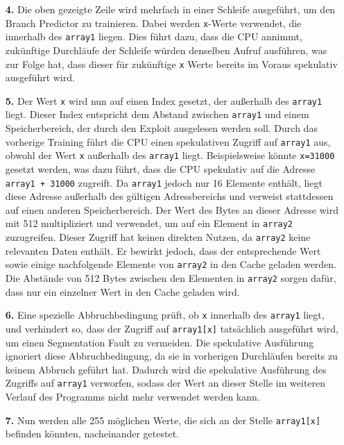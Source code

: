 \begin{itemize}
	\item[\textbf{4.}]\label{itm:spectre_step4} Die oben gezeigte Zeile wird mehrfach in einer Schleife ausgeführt, um den Branch Predictor zu trainieren.
	      Dabei werden \texttt{x}-Werte verwendet, die innerhalb des \texttt{array1} liegen.
	      Dies führt dazu, dass die CPU annimmt, zukünftige Durchläufe der Schleife würden denselben Aufruf ausführen,
	      was zur Folge hat, dass dieser für zukünftige \texttt{x} Werte bereits im Voraus spekulativ ausgeführt wird.
	\item[\textbf{5.}] Der Wert \texttt{x} wird nun auf einen Index gesetzt, der außerhalb des \texttt{array1} liegt.
	      Dieser Index entspricht dem Abstand zwischen \texttt{array1} und einem Speicherbereich, der durch den Exploit ausgelesen werden soll.
	      Durch das vorherige Training führt die CPU einen spekulativen Zugriff auf \texttt{array1} aus, obwohl der Wert \texttt{x} außerhalb des \texttt{array1} liegt.
	      Beispielsweise könnte \texttt{x=31000} gesetzt werden, was dazu führt, dass die CPU spekulativ auf die Adresse \texttt{array1 + 31000} zugreift.
	      Da \texttt{array1} jedoch nur 16 Elemente enthält, liegt diese Adresse außerhalb des gültigen Adressbereichs und verweist stattdessen auf einen anderen Speicherbereich.
	      Der Wert des Bytes an dieser Adresse wird mit 512 multipliziert und verwendet, um auf ein Element in \texttt{array2} zuzugreifen.
	      Dieser Zugriff hat keinen direkten Nutzen, da \texttt{array2} keine relevanten Daten enthält.
	      Er bewirkt jedoch, dass der entsprechende Wert sowie einige nachfolgende Elemente von \texttt{array2} in den Cache geladen werden.
	      Die Abstände von 512 Bytes zwischen den Elementen in \texttt{array2} sorgen dafür, dass nur ein einzelner Wert in den Cache geladen wird.
	\item[\textbf{6.}] Eine spezielle Abbruchbedingung prüft, ob \texttt{x} innerhalb des \texttt{array1} liegt, und verhindert so, dass der Zugriff auf \texttt{array1[x]} tatsächlich ausgeführt wird, um einen Segmentation Fault zu vermeiden.
	      Die spekulative Ausführung ignoriert diese Abbruchbedingung, da sie in vorherigen Durchläufen bereits zu keinem Abbruch geführt hat.
	      Dadurch wird die spekulative Ausführung des Zugriffs auf \texttt{array1} verworfen, sodass der Wert an dieser Stelle im weiteren Verlauf des Programms nicht mehr verwendet werden kann.
	\item[\textbf{7.}] Nun werden alle 255 möglichen Werte, die sich an der Stelle \texttt{array1[x]} befinden könnten, nacheinander getestet.

\end{itemize}
